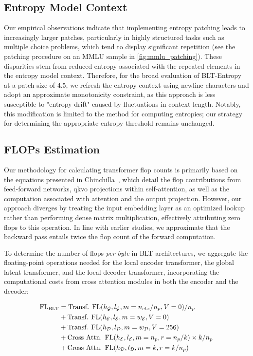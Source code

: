\subsection{Entropy Model Context}
\label{section:entropy-context}
Our empirical observations indicate that implementing entropy patching leads to increasingly larger patches, particularly in highly structured tasks such as multiple choice problems, which tend to display significant repetition (see the patching procedure on an MMLU sample in \autoref{fig:mmlu_patching}). These disparities stem from reduced entropy associated with the repeated elements in the entropy model context. Therefore, for the broad evaluation of {\textsc BLT}-Entropy at a patch size of 4.5, we refresh the entropy context using newline characters and adopt an approximate monotonicity constraint, as this approach is less susceptible to "entropy drift" caused by fluctuations in context length. Notably, this modification is limited to the method for computing entropies; our strategy for determining the appropriate entropy threshold remains unchanged.

\subsection{FLOPs Estimation} 
\label{section:flops}

Our methodology for calculating transformer flop counts is primarily based on the equations presented in Chinchilla~\citep{hoffmann2022training}, which detail the flop contributions from feed-forward networks, qkvo projections within self-attention, as well as the computation associated with attention and the output projection. However, our approach diverges by treating the input embedding layer as an optimized lookup rather than performing dense matrix multiplication, effectively attributing zero flops to this operation. In line with earlier studies, we approximate that the backward pass entails twice the flop count of the forward computation.

To determine the number of flops \textit{per byte} in {\textsc BLT} architectures, we aggregate the floating-point operations needed for the local encoder transformer, the global latent transformer, and the local decoder transformer, incorporating the computational costs from cross attention modules in both the encoder and the decoder:

\begin{align}
    \text{FL}_{\text{{\textsc BLT}}} &= \text{Transf. FL}(h_{\mathcal{G}}, l_{\mathcal{G}}, m=n_{ctx}/n_p,V=0) / n_p\\
   &+\text{Transf. FL}(h_{\mathcal{E}}, l_{\mathcal{E}}, m=w_{\mathcal{E}}, V=0) \\
   &+ \text{Transf. FL}(h_{\mathcal{D}}, l_{\mathcal{D}}, m=w_{\mathcal{D}}, V=256) \\ 
    &+ \text{Cross Attn. FL}(h_{\mathcal{E}}, l_{\mathcal{E}}, m=n_p, r=n_p/k) \times k/n_p \\ 
   &+ \text{Cross Attn. FL}(h_{\mathcal{D}}, l_{\mathcal{D}}, m=k, r=k/n_p) 
\end{align}

